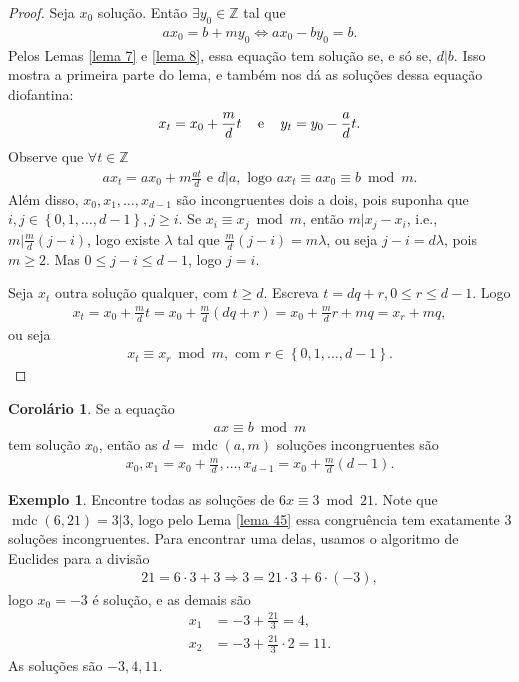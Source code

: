 \documentclass[a4paper,11pt,twoside, leqno]{article}
\DeclareMathOperator{\mdc}{mdc}
\theoremstyle{definition}
\newtheorem{corollary}{Corolário}[theorem]
\newtheorem*{example}{Exemplo}
\begin{document}
\begin{proof}
	Seja $x_0$ solução. Então $\exists y_0\in\mathbb{Z}$ tal que
	\begin{align*}
	ax_0 = b + my_0 \Leftrightarrow ax_0 - by_0 = b.
	\end{align*}
	Pelos Lemas \eqref{lema 7} e \eqref{lema 8}, essa equação tem solução se, e só se, $d|b$. Isso mostra a primeira parte do lema, e também nos dá as soluções dessa equação diofantina:
	\begin{align*}
	x_t = x_0 + \frac{m}{d}t \hspace{0.3cm} \text{ e }\hspace{0.3cm} y_t = y_0 - \frac{a}{d}t.
	\end{align*}
	Observe que $\forall t\in\mathbb{Z}$
	\begin{align*}
	ax_t = ax_0 + m\frac{at}{d} \text{ e } d|a, \text{ logo } ax_t\equiv ax_0\equiv b\bmod m.
	\end{align*}
	Além disso, $x_0, x_1, \dots, x_{d-1}$ são incongruentes dois a dois, pois suponha que $i,j\in\left\{ 0,1,\dots,d-1 \right\}, j\geq i$. Se $x_i\equiv x_j\bmod m$, então $m|x_j - x_i$, i.e., $m\Big|\displaystyle{\frac{m}{d}(j-i)}$, logo existe $\lambda$ tal que $\displaystyle{\frac{m}{d}(j-i) = m\lambda}$, ou seja $j-i=d\lambda$, pois $m\geq 2$. Mas $0\leq j-i\leq d-1$, logo $j=i$. 
	\par\vspace{0.3cm} Seja $x_t$ outra solução qualquer, com $t\geq d$. Escreva $t = dq + r, 0\leq r\leq d-1$. Logo
	\begin{align*}
	x_t = x_0 + \frac{m}{d}t = x_0 + \frac{m}{d}(dq + r) = x_0 + \frac{m}{d}r + mq = x_r + mq,
	\end{align*}
	ou seja
	\begin{align*}
	x_t\equiv x_r\bmod m, \text{ com } r\in\left\{ 0,1,\dots,d-1 \right\}.
	\end{align*}
\end{proof}
\begin{corollary}
	Se a equação
	\begin{align*}
	ax\equiv b\bmod m
	\end{align*}
	tem solução $x_0$, então as $d=\mdc(a,m)$ soluções incongruentes são
	\begin{align*}
	x_0, x_1 = x_0 + \frac{m}{d}, \dots, x_{d-1} = x_0 + \frac{m}{d}(d-1).
	\end{align*}
\end{corollary}
\begin{example}
	Encontre todas as soluções de $6x\equiv 3\bmod 21$. Note que $\mdc(6,21) = 3|3$, logo pelo Lema \eqref{lema 45} essa congruência tem exatamente $3$ soluções incongruentes. Para encontrar uma delas, usamos o algoritmo de Euclides para a divisão
	\begin{align*}
	21 = 6\cdot 3 + 3 \Rightarrow 3 = 21\cdot 3 + 6\cdot(-3),
	\end{align*}
	logo $x_0 = -3$ é solução, e as demais são
	\begin{align*}
	x_1 &= -3 + \frac{21}{3} = 4, \\
	x_2 &= -3 + \frac{21}{3}\cdot 2 = 11.
	\end{align*}
	As soluções são $-3, 4, 11$.
\end{example}
\end{document}
